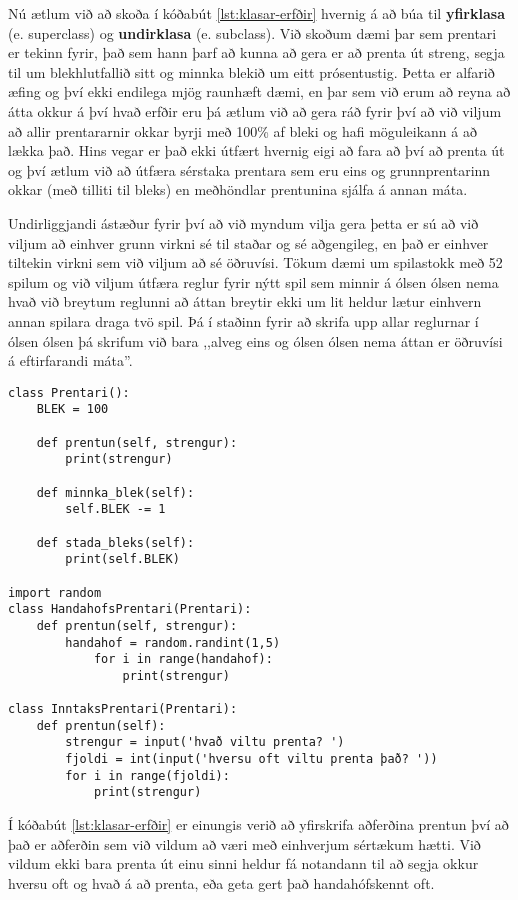 Nú ætlum við að skoða í kóðabút \ref{lst:klasar-erfðir} hvernig á að búa til \textbf{yfirklasa} (e. superclass) og \textbf{undirklasa} (e. subclass).
Við skoðum dæmi þar sem prentari er tekinn fyrir, það sem hann þarf að kunna að gera er að prenta út streng, segja til um blekhlutfallið sitt og minnka blekið um eitt prósentustig.
Þetta er alfarið æfing og því ekki endilega mjög raunhæft dæmi, en þar sem við erum að reyna að átta okkur á því hvað erfðir eru þá ætlum við að gera ráð fyrir því að við viljum að allir prentararnir okkar byrji með 100\% af bleki og hafi möguleikann á að lækka það.
Hins vegar er það ekki útfært hvernig eigi að fara að því að prenta út og því ætlum við að útfæra sérstaka prentara sem eru eins og grunnprentarinn okkar (með tilliti til bleks) en meðhöndlar prentunina sjálfa á annan máta.

Undirliggjandi ástæður fyrir því að við myndum vilja gera þetta er sú að við viljum að einhver grunn virkni sé til staðar og sé aðgengileg, en það er einhver tiltekin virkni sem við viljum að sé öðruvísi.
Tökum dæmi um spilastokk með 52 spilum og við viljum útfæra reglur fyrir nýtt spil sem minnir á ólsen ólsen nema hvað við breytum reglunni að áttan breytir ekki um lit heldur lætur einhvern annan spilara draga tvö spil.
Þá í staðinn fyrir að skrifa upp allar reglurnar í ólsen ólsen þá skrifum við bara ,,alveg eins og ólsen ólsen nema áttan er öðruvísi á eftirfarandi máta''.

\begin{lstlisting}[caption=Erfðir kynntar með klasanum Prentari, label=lst:klasar-erfðir]
class Prentari():
	BLEK = 100
	
	def prentun(self, strengur):
		print(strengur)
	
	def minnka_blek(self):
		self.BLEK -= 1
	
	def stada_bleks(self):
		print(self.BLEK)
		
import random
class HandahofsPrentari(Prentari):
	def prentun(self, strengur):
		handahof = random.randint(1,5)
			for i in range(handahof):
				print(strengur)

class InntaksPrentari(Prentari):
	def prentun(self):
		strengur = input('hvað viltu prenta? ')
		fjoldi = int(input('hversu oft viltu prenta það? '))
		for i in range(fjoldi):
			print(strengur)
\end{lstlisting}

Í kóðabút \ref{lst:klasar-erfðir} er einungis verið að yfirskrifa aðferðina prentun því að það er aðferðin sem við vildum að væri með einhverjum sértækum hætti.
Við vildum ekki bara prenta út einu sinni heldur fá notandann til að segja okkur hversu oft og hvað á að prenta, eða geta gert það handahófskennt oft.

